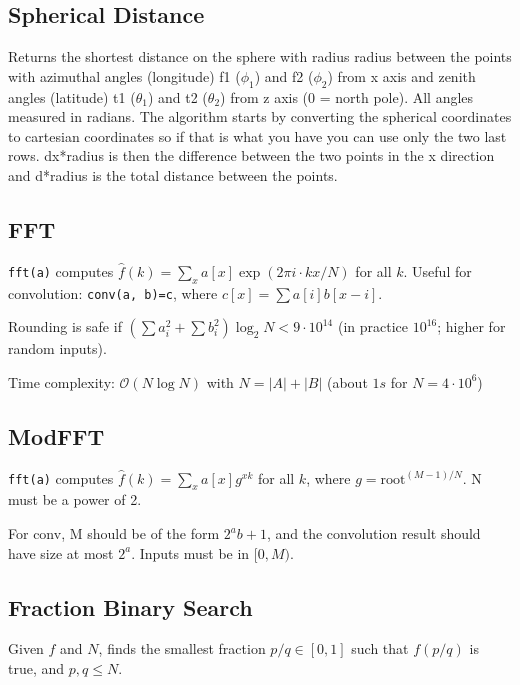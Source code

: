 \documentclass{article}
\begin{document}
\pagebreak

\subsection*{Spherical Distance}
\begin{multicols}{2}
  \columnbreak
  Returns the shortest distance on the sphere with radius radius between the points
 with azimuthal angles (longitude) f1 ($\phi_1$) and f2 ($\phi_2$) from x axis and zenith angles
 (latitude) t1 ($\theta_1$) and t2 ($\theta_2$) from z axis (0 = north pole). All angles measured
 in radians. The algorithm starts by converting the spherical coordinates to cartesian coordinates
 so if that is what you have you can use only the two last rows. dx*radius is then the difference
 between the two points in the x direction and d*radius is the total distance between the points.
\end{multicols}

\subsection*{FFT}
\lstinline{fft(a)} computes $\hat f(k) = \sum_x a[x] \exp(2\pi i \cdot k x / N)$ for all $k$.
Useful for convolution: \lstinline{conv(a, b)=c}, where $c[x] = \sum a[i]b[x-i]$.

Rounding is safe if $(\sum a_i^2 + \sum b_i^2)\log_2{N} < 9\cdot10^{14}$
(in practice $10^{16}$; higher for random inputs).

Time complexity: $\mathcal{O}(N \log N)$ with $N = |A|+|B|$ (about $1s$ for $N=4 \cdot 10^6$)


\newpage

\subsection*{ModFFT}
\lstinline{fft(a)} computes $\hat f(k) = \sum_x a[x] g^{xk}$ for all $k$, where $g=\text{root}^{(M-1)/N}$. N must be a power of 2.

For conv, M should be of the form $2^a b+1$, and the convolution result should have size at most $2^a$. Inputs must be in $[0,M)$.



\vspace*{-0.3cm}

\subsection*{Fraction Binary Search}
Given $f$ and $N$, finds the smallest fraction $p/q \in [0, 1]$ such that $f(p/q)$ is true, and $p, q \le N$.

\end{document}

